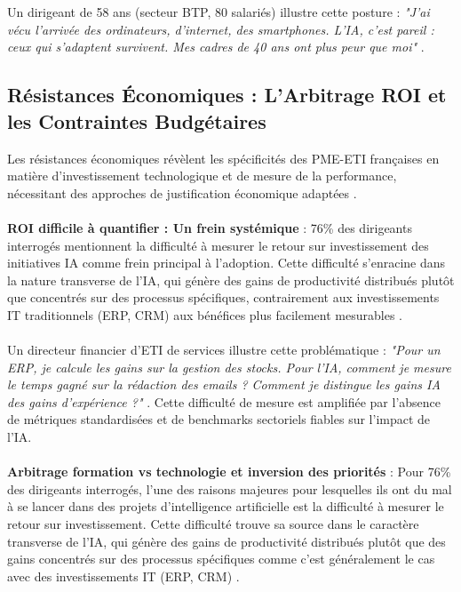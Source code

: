 \\\\
Un dirigeant de 58 ans (secteur BTP, 80 salariés) illustre cette posture : \emph{"J'ai vécu l'arrivée des ordinateurs, d'internet, des smartphones. L'IA, c'est pareil : ceux qui s'adaptent survivent. Mes cadres de 40 ans ont plus peur que moi"} \cite{luwai2025meetings}.

\subsection{Résistances Économiques : L'Arbitrage ROI et les Contraintes Budgétaires}

Les résistances économiques révèlent les spécificités des PME-ETI françaises en matière d'investissement technologique et de mesure de la performance, nécessitant des approches de justification économique adaptées \cite{kaplan1996balanced}.
\\\\
\textbf{ROI difficile à quantifier : Un frein systémique} : 76\% des dirigeants interrogés mentionnent la difficulté à mesurer le retour sur investissement des initiatives IA comme frein principal à l'adoption. Cette difficulté s'enracine dans la nature transverse de l'IA, qui génère des gains de productivité distribués plutôt que concentrés sur des processus spécifiques, contrairement aux investissements IT traditionnels (ERP, CRM) aux bénéfices plus facilement mesurables \cite{brynjolfsson2017business}.
\\\\
Un directeur financier d'ETI de services illustre cette problématique : \emph{"Pour un ERP, je calcule les gains sur la gestion des stocks. Pour l'IA, comment je mesure le temps gagné sur la rédaction des emails ? Comment je distingue les gains IA des gains d'expérience ?"} \cite{luwai2025meetings}. Cette difficulté de mesure est amplifiée par l'absence de métriques standardisées et de benchmarks sectoriels fiables sur l'impact de l'IA.
\\\\
\textbf{Arbitrage formation vs technologie et inversion des priorités} : Pour 76\% des dirigeants interrogés, l’une des raisons majeures pour lesquelles ils ont du mal à se lancer dans des projets d’intelligence artificielle est la difficulté à mesurer le retour sur investissement. Cette difficulté trouve sa source dans le caractère transverse de l’IA, qui génère des gains de productivité distribués plutôt que des gains concentrés sur des processus spécifiques comme c’est généralement le cas avec des investissements IT (ERP, CRM) \cite{brynjolfsson2017business}.
